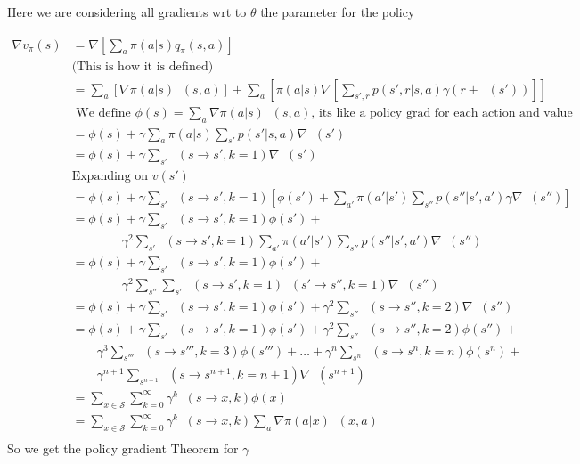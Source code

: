 \documentclass{article}
\DeclareMathOperator{\qp}{q_\pi} %
\DeclareMathOperator{\vp}{v_\pi} %
\DeclareMathOperator{\rhp}{\rho_{\pi}} %
\begin{document}
Here we are considering all gradients wrt to $\theta$ the parameter for the policy

\begin{align*}
    \nabla v_{\pi}(s) &= \nabla[\sum_a \pi(a| s)q_\pi(s,a)]\\
    & \text{(This is how it is defined)}\\
    &= \sum_a [\nabla \pi(a|s) \qp(s,a)] + \sum_a [\pi(a|s) \nabla [\sum_{s',r} p(s',r|s,a) \gamma(r + \vp(s'))]]\\
    &\text{ We define $\phi(s) = \sum_a \nabla \pi(a|s) \qp(s,a)$, its like a policy grad for each action and value }\\
    &= \phi(s) + \gamma\sum_a \pi(a|s)\sum_{s'}p(s'|s,a)\nabla \vp(s')\\
    &= \phi(s) + \gamma \sum_{s'}\rhp(s \rightarrow s',k=1)\nabla \vp(s')\\
    &\text{Expanding on $v(s')$}\\
    &= \phi(s) + \gamma \sum_{s'}\rhp(s \rightarrow s',k=1)[\phi(s') + \sum_{a'}\pi(a'|s') \sum_{s''}p(s''|s',a')\gamma\nabla\vp(s'')]\\
    &= \phi(s) + \gamma \sum_{s'}\rhp(s \rightarrow s',k=1)\phi(s') + \\
    & \qquad\qquad \gamma^2 \sum_{s'}\rhp(s \rightarrow s',k=1)\sum_{a'}\pi(a'|s') \sum_{s''}p(s''|s',a')\nabla\vp(s'')\\
    &= \phi(s) + \gamma \sum_{s'}\rhp(s \rightarrow s',k=1)\phi(s') + \\
    & \qquad\qquad \gamma^2 \sum_{s''}\sum_{s'}\rhp(s \rightarrow s',k=1)\rhp(s' \rightarrow s'', k = 1)\nabla\vp(s'')\\
    &= \phi(s) + \gamma \sum_{s'}\rhp(s \rightarrow s',k=1)\phi(s') + \gamma^2 \sum_{s''}\rhp(s \rightarrow s'', k = 2)\nabla\vp(s'')\\
    &= \phi(s) + \gamma \sum_{s'}\rhp(s \rightarrow s',k=1)\phi(s') + \gamma^2 \sum_{s''}\rhp(s \rightarrow s'', k = 2)\phi(s'') +\\
    & \qquad \gamma^3 \sum_{s'''}\rhp(s \rightarrow s''', k = 3)\phi(s''') + \ldots + \gamma^n \sum_{s^n}\rhp(s \rightarrow s^n, k = n)\phi(s^n) + \\
    &\qquad \gamma^{n+1} \sum_{s^{n+1}}\rhp(s \rightarrow s^{n+1}, k = n+1)\nabla\vp(s^{n+1})\\
    &= \sum_{x \in \mathcal{S}}\sum_{k = 0}^{\infty} \gamma^k \rhp(s \rightarrow x, k)\phi(x)\\
    &= \sum_{x \in \mathcal{S}}\sum_{k = 0}^{\infty} \gamma^k \rhp(s \rightarrow x, k) \sum_a \nabla \pi(a|x) \qp(x,a)\\
\end{align*}
So we get the policy gradient Theorem for $\gamma$
\end{document}
